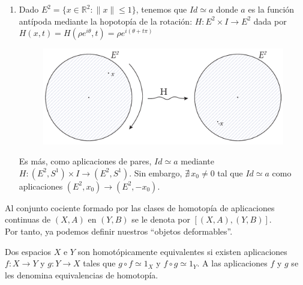 \begin{ejems}
\begin{enumerate}
\item \label{ej2:3} Dado $E^2 = \{ x \in \mathbb{R}^2 : \| x \| \leq 1 \}$, tenemos que $Id \simeq a$ donde $a$ es la función antípoda mediante la hopotopía de la rotación: $H : E^2 \times I \longrightarrow E^2$ dada por $H(x, t) = H(\rho e^{i\theta}, t) = \rho e^{i(\theta + t\pi)}$ \par
\begin{figure}[h]
\centering
\includegraphics[width=0.65\linewidth]{images/homotrotacalt.pdf}
\end{figure}
Es más, como aplicaciones de pares, $Id \simeq a$ mediante $H : (E^2, S^1) \times I \longrightarrow (E^2, S^1)$. Sin embargo, $\nexists \, x_0 \neq 0$ tal que $Id \simeq a$ como aplicaciones $(E^2, x_0) \longrightarrow (E^2, -x_0)$.
\end{enumerate}
\end{ejems}
Al conjunto cociente formado por las clases de homotopía de aplicaciones continuas de $(X, A)$ en $(Y, B)$ se le denota por $[(X, A), (Y, B)]$.\\
Por tanto, ya podemos definir nuestros ``objetos deformables''.
\begin{defin}
Dos espacios $X$ e $Y$ son homotópicamente equivalentes si existen aplicaciones $f: X \longrightarrow Y$ y $g: Y \longrightarrow X$ tales que $g \circ f \simeq 1_X$ y $f \circ g \simeq 1_Y$. A las aplicaciones $f$ y $g$ se les denomina equivalencias de homotopía.
\end{defin}

